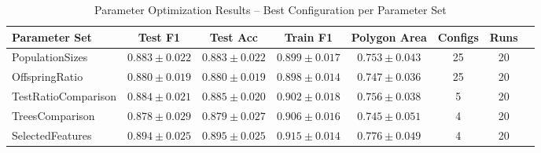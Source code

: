 \begin{table}[htbp]
\centering
\caption{Parameter Optimization Results -- Best Configuration per Parameter Set}
\label{tab:results}
\begin{tabular}{lccccccc}
\hline
\textbf{Parameter Set} & \textbf{Test F1} & \textbf{Test Acc} & \textbf{Train F1} & \textbf{Polygon Area} & \textbf{Configs} & \textbf{Runs} \\
\hline
PopulationSizes & $0.883 \pm 0.022$ & $0.883 \pm 0.022$ & $0.899 \pm 0.017$ & $0.753 \pm 0.043$ & 25 & 20 \\
OffspringRatio & $0.880 \pm 0.019$ & $0.880 \pm 0.019$ & $0.898 \pm 0.014$ & $0.747 \pm 0.036$ & 25 & 20 \\
TestRatioComparison & $0.884 \pm 0.021$ & $0.885 \pm 0.020$ & $0.902 \pm 0.018$ & $0.756 \pm 0.038$ & 5 & 20 \\
TreesComparison & $0.878 \pm 0.029$ & $0.879 \pm 0.027$ & $0.906 \pm 0.016$ & $0.745 \pm 0.051$ & 4 & 20 \\
SelectedFeatures & $0.894 \pm 0.025$ & $0.895 \pm 0.025$ & $0.915 \pm 0.014$ & $0.776 \pm 0.049$ & 4 & 20 \\
\hline
\end{tabular}
\end{table}
